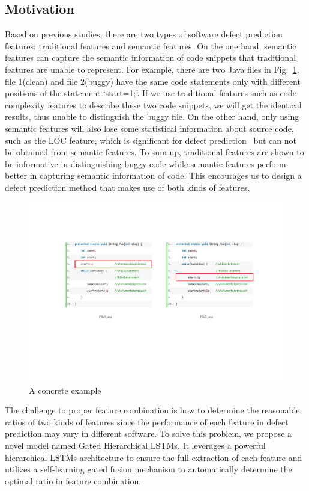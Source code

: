 \documentclass[journal]{IEEEtran}
\begin{document}
\subsection{Motivation}
Based on previous studies, there are two types of software defect prediction features: traditional features and semantic features. On the one hand, semantic features can capture the semantic information of code snippets that traditional features are unable to represent. For example, there are two Java files in Fig.~\ref{fig1}, file 1(clean) and file 2(buggy) have the same code statements only with different positions of the statement `start=1;'. If we use traditional features such as code complexity features to describe these two code snippets, we will get the identical results, thus unable to distinguish the buggy file. On the other hand, only using semantic features will also lose some statistical information about source code, such as the LOC feature, which is significant for defect prediction~\cite{zhou2018far} but can not be obtained from semantic features. To sum up, traditional features are shown to be informative in distinguishing buggy code while semantic features perform better in capturing semantic information of code. This encourages us to design a defect prediction method that makes use of both kinds of features.
\begin{figure}[htbp]
	\centering
	\includegraphics{figs/example.pdf}
	\caption{A concrete example}
	\label{fig1}
\end{figure}

The challenge to proper feature combination is how to determine the reasonable ratios of two kinds of features since the performance of each feature in defect prediction may vary in different software. To solve this problem, we propose a novel model named Gated Hierarchical LSTMs. It leverages a powerful hierarchical LSTMs architecture to ensure the full extraction of each feature and utilizes a self-learning gated fusion mechanism to automatically determine the optimal ratio in feature combination.
\end{document}
